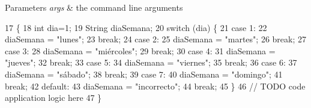\begin{DoxyParams}{Parameters}
{\em args} & the command line arguments \\
\hline
\end{DoxyParams}

\begin{DoxyCode}
17                                            \{
18          \textcolor{keywordtype}{int} dia=1;
19         String diaSemana;
20         \textcolor{keywordflow}{switch} (dia) \{
21             \textcolor{keywordflow}{case} 1:
22                 diaSemana = \textcolor{stringliteral}{"lunes"};
23                 \textcolor{keywordflow}{break};
24             \textcolor{keywordflow}{case} 2:
25                 diaSemana = \textcolor{stringliteral}{"martes"};
26                 \textcolor{keywordflow}{break};
27             \textcolor{keywordflow}{case} 3:
28                 diaSemana = \textcolor{stringliteral}{"miércoles"};
29                 \textcolor{keywordflow}{break};
30             \textcolor{keywordflow}{case} 4:
31                 diaSemana = \textcolor{stringliteral}{"jueves"};
32                 \textcolor{keywordflow}{break};
33             \textcolor{keywordflow}{case} 5:
34                 diaSemana = \textcolor{stringliteral}{"viernes"};
35                 \textcolor{keywordflow}{break};
36             \textcolor{keywordflow}{case} 6:
37                 diaSemana = \textcolor{stringliteral}{"sábado"};
38                 \textcolor{keywordflow}{break};
39             \textcolor{keywordflow}{case} 7:
40                 diaSemana = \textcolor{stringliteral}{"domingo"};
41                 \textcolor{keywordflow}{break};
42             \textcolor{keywordflow}{default}:
43                 diaSemana = \textcolor{stringliteral}{"incorrecto"};
44                 \textcolor{keywordflow}{break};
45         \}
46 \textcolor{comment}{// TODO code application logic here}
47     \}
\end{DoxyCode}
